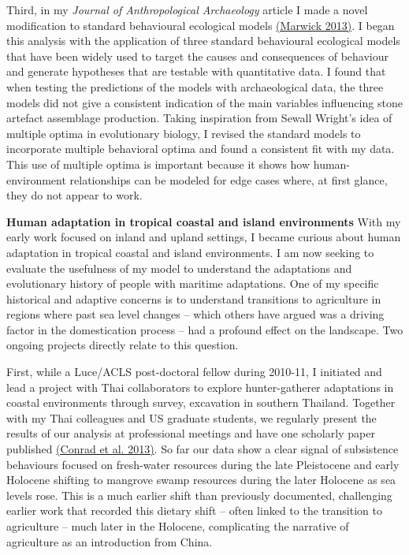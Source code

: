 \documentclass[11pt,article,oneside]{memoir}
\begin{document}
Third, in my \textit{Journal of Anthropological Archaeology} article I made a novel modification to standard behavioural ecological models  {\href{http://faculty.washington.edu/bmarwick/PDFs/Marwick_2013_JAA.pdf}{(Marwick 2013)}}. I began this analysis with the application of three standard behavioural ecological models that have been widely used to target the causes and consequences of behaviour and generate hypotheses that are testable with quantitative data. I found that when testing the predictions of the models with archaeological data, the three models did not give a consistent indication of the main variables influencing stone artefact assemblage production. Taking inspiration from Sewall Wright's idea of multiple optima in evolutionary biology, I revised the standard models to incorporate multiple behavioral optima and found a consistent fit with my data. This use of multiple optima is important because it shows how human-environment relationships can be modeled for edge cases where, at first glance, they do not appear to work.

\textbf{Human adaptation in tropical coastal and island environments} With my early work focused on inland and upland settings, I became curious about human adaptation in tropical coastal and island environments. I am now seeking to evaluate the usefulness of my model to understand the adaptations and evolutionary history of people with maritime adaptations. One of my specific historical and adaptive concerns is to understand transitions to agriculture in regions where past sea level changes – which others have argued was a driving factor in the domestication process –  had a profound effect on the landscape. Two ongoing projects directly relate to this question.

First, while a Luce/ACLS post-doctoral fellow during 2010-11, I initiated and lead a project with Thai collaborators to explore hunter-gatherer adaptations in coastal environments through survey, excavation in southern Thailand. Together with my Thai colleagues and US graduate students, we regularly present the results of our analysis at professional meetings and have one scholarly paper published {\href{http://faculty.washington.edu/bmarwick/PDFs/Conrad_et_al_2013_TNHMJ.pdf}{(Conrad et al. 2013)}}. So far our data show a clear signal of subsistence behaviours focused on fresh-water resources during the late Pleistocene and early Holocene shifting to mangrove swamp resources during the later Holocene as sea levels rose.  This is a much earlier shift than previously documented, challenging earlier work that recorded this dietary shift – often linked to the transition to agriculture – much later in the Holocene, complicating the narrative of agriculture as an introduction from China. 
\end{document}
